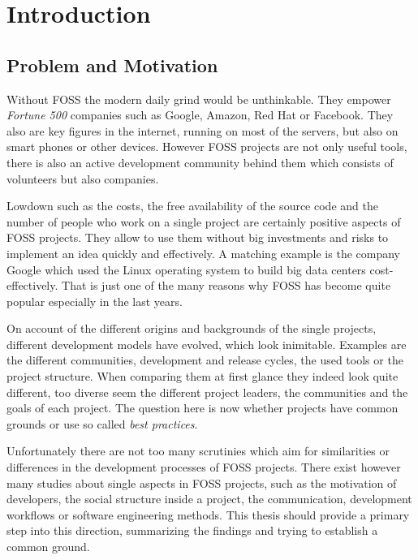 \chapter{Introduction} %
\label{chap:introduction}

\section{Problem and Motivation} %

Without \ac{FOSS} the modern daily grind would be unthinkable. They empower
\emph{Fortune 500} companies such as Google, Amazon, Red Hat or Facebook. They
also are key figures in the internet, running on most of the servers, but also
on smart phones or other devices. However \ac{FOSS} projects are not only
useful tools, there is also an active development community behind them which
consists of volunteers but also companies.

Lowdown such as the costs, the free availability of the source code and the
number of people who work on a single project are certainly positive aspects of
\ac{FOSS} projects. They allow to use them without big investments and risks to
implement an idea quickly and effectively. A matching example is the company
Google which used the Linux operating system to build big data centers
cost-effectively. That is just one of the many reasons why \ac{FOSS} has become
quite popular especially in the last years.

On account of the different origins and backgrounds of the single projects,
different development models have evolved, which look inimitable. Examples are
the different communities, development and release cycles, the used tools or
the project structure. When comparing them at first glance they indeed look
quite different, too diverse seem the different project leaders, the
communities and the goals of each project. The question here is now whether
projects have common grounds or use so called \emph{best practices}.

Unfortunately there are not too many scrutinies which aim for similarities or
differences in the development processes of \ac{FOSS} projects. There exist
however many studies about single aspects in \ac{FOSS} projects, such as the
motivation of developers, the social structure inside a project, the
communication, development workflows or software engineering methods. This
thesis should provide a primary step into this direction, summarizing the
findings and trying to establish a common ground.

